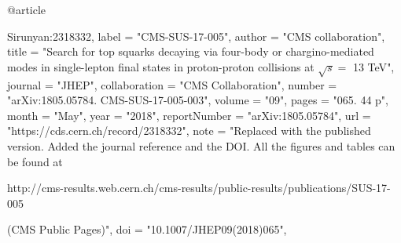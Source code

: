 @article{Sirunyan:2318332,
      label          = "CMS-SUS-17-005",
      author        = "{CMS collaboration}",
      title         = "{Search for top squarks decaying via four-body or
                       chargino-mediated modes in single-lepton final states in
                       proton-proton collisions at $\sqrt{s} =$ 13 TeV}",
      journal       = "JHEP",
      collaboration = "CMS Collaboration",
      number        = "arXiv:1805.05784. CMS-SUS-17-005-003",
      volume        = "09",
      pages         = "065. 44 p",
      month         = "May",
      year          = "2018",
      reportNumber  = "arXiv:1805.05784",
      url           = "https://cds.cern.ch/record/2318332",
      note          = "Replaced with the published version. Added the journal
                       reference and
  the DOI. All the figures and tables can be
                       found at
 
                       http://cms-results.web.cern.ch/cms-results/public-results/publications/SUS-17-005

                        (CMS Public Pages)",
      doi           = "10.1007/JHEP09(2018)065",
}

